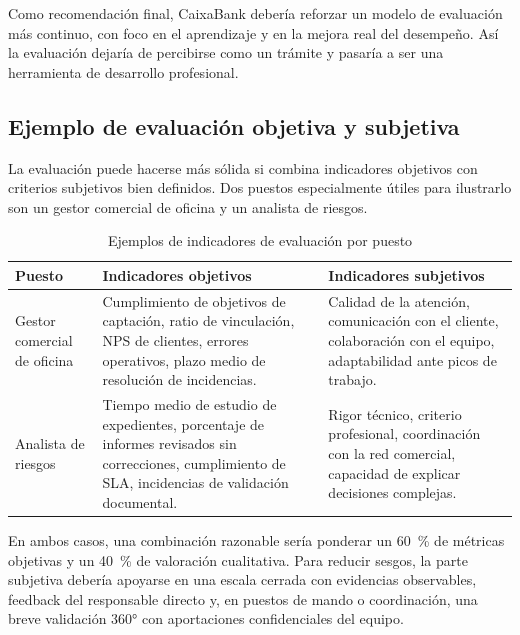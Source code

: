 Como recomendación final, CaixaBank debería reforzar un modelo de evaluación más continuo, con foco en el aprendizaje y en la mejora real del desempeño. Así la evaluación dejaría de percibirse como un trámite y pasaría a ser una herramienta de desarrollo profesional.

\subsection*{Ejemplo de evaluación objetiva y subjetiva}

\begin{bloquedemejora}

La evaluación puede hacerse más sólida si combina indicadores objetivos con
criterios subjetivos bien definidos. Dos puestos especialmente útiles para
ilustrarlo son un gestor comercial de oficina y un analista de riesgos.

\begin{table}[H]
\centering
\small
\caption{Ejemplos de indicadores de evaluación por puesto}
\label{tab:ejemplo-evaluacion-puestos}
\begin{tabularx}{\textwidth}{|p{}|p{}|p{}|}
\hline
\textbf{Puesto} & \textbf{Indicadores objetivos} & \textbf{Indicadores subjetivos} \\
\hline
Gestor comercial de oficina & Cumplimiento de objetivos de captación, ratio de vinculación, NPS de clientes, errores operativos, plazo medio de resolución de incidencias. & Calidad de la atención, comunicación con el cliente, colaboración con el equipo, adaptabilidad ante picos de trabajo. \\
\hline
Analista de riesgos & Tiempo medio de estudio de expedientes, porcentaje de informes revisados sin correcciones, cumplimiento de SLA, incidencias de validación documental. & Rigor técnico, criterio profesional, coordinación con la red comercial, capacidad de explicar decisiones complejas. \\
\hline
\end{tabularx}
\end{table}

En ambos casos, una combinación razonable sería ponderar un 60~\% de métricas
objetivas y un 40~\% de valoración cualitativa. Para reducir sesgos, la parte
subjetiva debería apoyarse en una escala cerrada con evidencias observables,
feedback del responsable directo y, en puestos de mando o coordinación, una
breve validación 360° con aportaciones confidenciales del equipo.

\end{bloquedemejora}